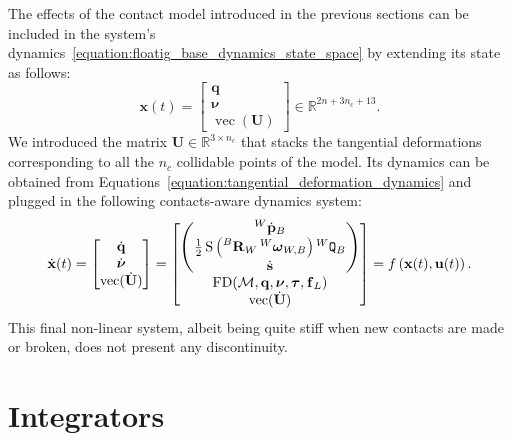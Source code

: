 The effects of the contact model introduced in the previous sections can be included in the system's dynamics~\eqref{equation:floatig_base_dynamics_state_space} by extending its state as follows:
%
\begin{equation*}
    \mathbf{x}(t) =
    \begin{bmatrix}
        \mathbf{q} \\ \boldsymbol{\nu} \\ \operatorname{vec}(\mathbf{U})
    \end{bmatrix}
    \in \mathbb{R}^{2n+3n_c+13}
    .
\end{equation*}
%
We introduced the matrix $\mathbf{U} \in \mathbb{R}^{3 \times n_c}$ that stacks the tangential deformations corresponding to all the $n_c$ collidable points of the model.
Its dynamics can be obtained from Equations~\eqref{equation:tangential_deformation_dynamics} and plugged in the following contacts-aware dynamics system:
%
\begin{equation}
\label{equation:floatig_base_dynamics_with_contacts_state_space}
    \dot{\mathbf{x}}(t) =
    \begin{bmatrix}
        \dot{\mathbf{q}} \\ \dot{\boldsymbol{\nu}} \\ \operatorname{vec}(\dot{\mathbf{U}})
    \end{bmatrix} =
    \begin{bmatrix}
        \begin{pmatrix}
            \posd[W]_B \\
            \frac{1}{2} \operatorname{S}\left( \rot[B]_W \velang[W]_{W,B} \right) \quat[W]_B \\
            \dot{\mathbf{s}}
        \end{pmatrix} \\
        \operatorname{FD}(\mathcal{M}, \mathbf{q}, \boldsymbol{\nu}, \boldsymbol{\tau}, \forcesix_L) \\
        \operatorname{vec}(\dot{\mathbf{U}})
    \end{bmatrix} =
    f\left(\mathbf{x}(t), \mathbf{u}(t)\right)
    .
\end{equation}
%
This final non-linear system, albeit being quite stiff when new contacts are made or broken, does not present any discontinuity.

\section{Integrators}
\label{sec:integrators}

